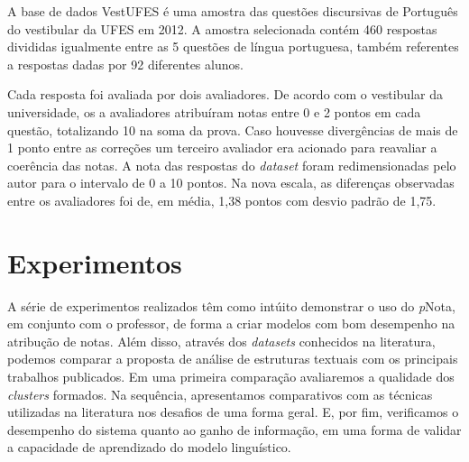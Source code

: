 A base de dados VestUFES \cite{pissinati2014} é uma amostra das questões discursivas de Português do vestibular da UFES em 2012. A amostra selecionada contém 460 respostas divididas igualmente entre as 5 questões de língua portuguesa, também referentes a respostas dadas por 92 diferentes alunos.

Cada resposta foi avaliada por dois avaliadores. De acordo com o vestibular da universidade, os a avaliadores atribuíram notas entre 0 e 2 pontos em cada questão, totalizando 10 na soma da prova. Caso houvesse divergências de mais de 1 ponto entre as correções um terceiro avaliador era acionado para reavaliar a coerência das notas. A nota das respostas do \textit{dataset} foram redimensionadas pelo autor para o intervalo de 0 a 10 pontos. Na nova escala, as diferenças observadas entre os avaliadores foi de, em média, 1,38 pontos com desvio padrão de 1,75.

\section{Experimentos}
\label{sec-experimentos}

A série de experimentos realizados têm como intúito demonstrar o uso do \textit{p}Nota, em conjunto com o professor, de forma a criar modelos com bom desempenho na atribução de notas. Além disso, através dos \textit{datasets} conhecidos na literatura, podemos comparar a proposta de análise de estruturas textuais com os principais trabalhos publicados. Em uma primeira comparação avaliaremos a qualidade dos \textit{clusters} formados. Na sequência, apresentamos comparativos com as técnicas utilizadas na literatura nos desafios de uma forma geral. E, por fim, verificamos o desempenho do sistema quanto ao ganho de informação, em uma forma de validar a capacidade de aprendizado do modelo linguístico.

